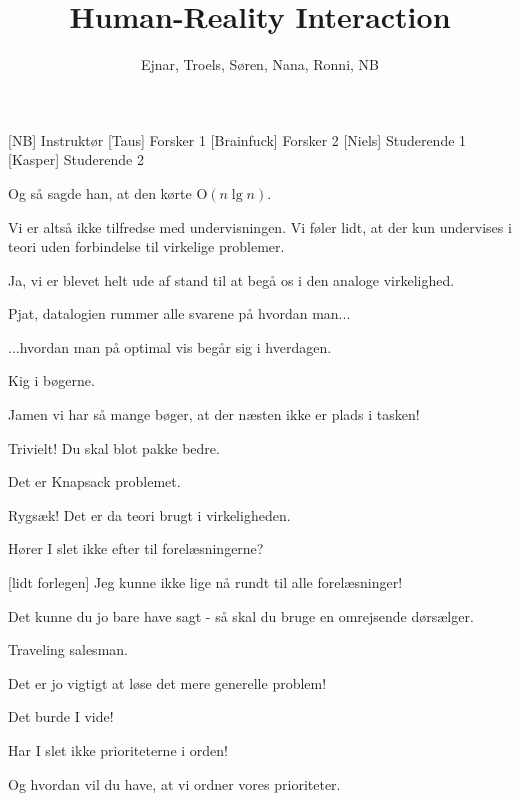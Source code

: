 \documentclass[a4paper,11pt]{article}
\title{Human-Reality Interaction}
\author{Ejnar, Troels, Søren, Nana, Ronni, NB}
\begin{document}
\maketitle

\begin{roles}
    [NB] Instruktør
    [Taus] Forsker 1
    [Brainfuck] Forsker 2
    [Niels] Studerende 1
    [Kasper] Studerende 2
\end{roles}

\begin{sketch}


   Og så sagde han, at den kørte O$(n \lg n)$.
  

   Vi er altså ikke tilfredse med undervisningen. Vi føler
  lidt, at der kun undervises i teori uden forbindelse til virkelige
  problemer.

   Ja, vi er blevet helt ude af stand til at begå os i den
  analoge virkelighed.

   Pjat, datalogien rummer alle svarene på hvordan man...
  
   ...hvordan man på optimal vis begår sig i hverdagen.
  
   Kig i bøgerne.

   Jamen vi har så mange bøger, at der næsten ikke er plads i
  tasken!

   Trivielt! Du skal blot pakke bedre.
  
   Det er Knapsack problemet.
  
   Rygsæk! Det er da teori brugt i virkeligheden.

   Hører I slet ikke efter til forelæsningerne?

  [lidt forlegen] Jeg kunne ikke lige nå rundt til alle
  forelæsninger!

   Det kunne du jo bare have sagt - så skal du bruge en
  omrejsende dørsælger.
  
   Traveling salesman.
  
   Det er jo vigtigt at løse det mere generelle problem!

   Det burde I vide!

   Har I slet ikke prioriteterne i orden!
  
   Og hvordan vil du have, at vi ordner vores prioriteter.


\end{sketch}
\end{document}
